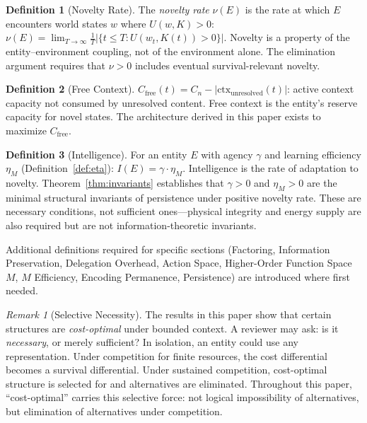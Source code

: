 \documentclass[11pt]{article}
\theoremstyle{definition}
\newtheorem{definition}{Definition}
\theoremstyle{remark}
\newtheorem*{remark}{Remark}
\begin{document}
\begin{definition}[Novelty Rate]
\label{def:novelty}
The \emph{novelty rate} $\nu(E)$ is the rate at which $E$ encounters
world states $w$ where $U(w, K) > 0$:
$\nu(E) = \lim_{T \to \infty} \frac{1}{T}
|\{t \leq T : U(w_t, K(t)) > 0\}|$.
Novelty is a property of the entity--environment coupling, not of
the environment alone. The elimination argument requires that $\nu > 0$
includes eventual survival-relevant novelty.
\end{definition}

\begin{definition}[Free Context]
\label{def:free}
$C_{\mathrm{free}}(t) = C_n - |\mathrm{ctx}_{\mathrm{unresolved}}(t)|$:
active context capacity not consumed by unresolved content. Free context
is the entity's reserve capacity for novel states. The architecture
derived in this paper exists to maximize $C_{\mathrm{free}}$.
\end{definition}

\begin{definition}[Intelligence]
\label{def:intelligence}
For an entity $E$ with agency $\gamma$ and learning efficiency $\eta_M$
(Definition~\ref{def:eta}):
$I(E) = \gamma \cdot \eta_M$.
Intelligence is the rate of adaptation to novelty.
Theorem~\ref{thm:invariants} establishes that $\gamma > 0$ and
$\eta_M > 0$ are the minimal structural invariants of persistence
under positive novelty rate. These are necessary conditions, not
sufficient ones---physical integrity and energy supply are also
required but are not information-theoretic invariants.
\end{definition}

Additional definitions required for specific sections (Factoring,
Information Preservation, Delegation Overhead, Action Space, Higher-Order
Function Space $M$, $M$ Efficiency, Encoding Permanence, Persistence)
are introduced where first needed.

\begin{remark}[Selective Necessity]
\label{rem:necessity}
The results in this paper show that certain structures are
\emph{cost-optimal} under bounded context.
A reviewer may ask: is it \emph{necessary}, or merely sufficient?
In isolation, an entity could use any representation. Under competition
for finite resources, the cost differential becomes a survival
differential. Under sustained competition, cost-optimal structure is
selected for and alternatives are eliminated. Throughout this paper,
``cost-optimal'' carries this selective force: not logical impossibility
of alternatives, but elimination of alternatives under competition.
\end{remark}
\end{document}
